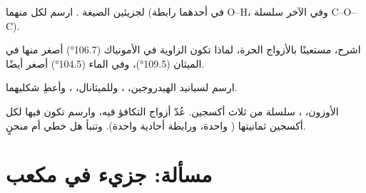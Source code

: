 \begin{exercise}[$\star\star\star$]\label{exo:g10:lewis-and-shape:12}
لجزيئين الصيغة . ارسم  لكل منهما (في أحدهما رابطة O--H،
وفي الآخر سلسلة C--O--C).
\end{exercise}

\begin{exercise}[$\star\star\star$]\label{exo:g10:lewis-and-shape:13}
اشرح، مستعينًا بالأزواج الحرة، لماذا تكون الزاوية في الأمونياك (\ang{106.7})
أصغر منها في الميثان (\ang{109.5})، وفي الماء (\ang{104.5}) أصغر
أيضًا.
\end{exercise}

\begin{exercise}[$\star\star\star$]\label{exo:g10:lewis-and-shape:14}
ارسم  لسيانيد الهيدروجين، ، وللميثانال،
، وأعطِ شكليهما.
\end{exercise}

\begin{exercise}[$\star\star\star$]\label{exo:g10:lewis-and-shape:15}
الأوزون، ، سلسلة من ثلاث  أكسجين. عُدّ أزواج التكافؤ فيه، وارسم
 تكون فيها لكل  أكسجين ثمانيتها ( واحدة، ورابطة أحادية
واحدة). وتنبأ هل  خطي أم
منحنٍ.
\end{exercise}

\section{مسألة: جزيء في مكعب}

